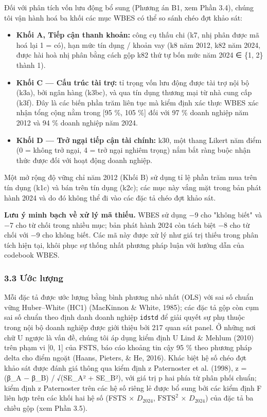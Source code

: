 \documentclass[12pt,a4paper]{article}
\providecommand{\tightlist}{\setlength{\itemsep}{0pt}\setlength{\parskip}{0pt}}
\begin{document}
Đối với phân tích vốn lưu động bổ sung (Phương án B1, xem Phần 3.4),
chúng tôi vận hành hoá ba khối các mục WBES có thể so sánh chéo đợt khảo
sát:

\begin{itemize}
\tightlist
\item
  \textbf{Khối A, Tiếp cận thanh khoản:} công cụ thấu chi (k7, nhị phân
  được mã hoá lại 1 = có), hạn mức tín dụng / khoản vay (k8 năm 2012,
  k82 năm 2024, được hài hoà nhị phân bằng cách gộp k82 thứ tự bốn mức
  năm 2024 ∈ \{1, 2\} thành 1).
\item
  \textbf{Khối C --- Cấu trúc tài trợ:} tỉ trọng vốn lưu động được tài
  trợ nội bộ (k3a), bởi ngân hàng (k3bc), và qua tín dụng thương mại từ
  nhà cung cấp (k3f). Đây là các biến phần trăm liên tục mà kiểm định
  xác thực WBES xác nhận tổng cộng nằm trong {[}95 \%, 105 \%{]} đối với
  97 \% doanh nghiệp năm 2012 và 94 \% doanh nghiệp năm 2024.
\item
  \textbf{Khối D --- Trở ngại tiếp cận tài chính:} k30, một thang Likert
  năm điểm (0 = không trở ngại, 4 = trở ngại nghiêm trọng) nắm bắt ràng
  buộc nhận thức được đối với hoạt động doanh nghiệp.
\end{itemize}

Một mở rộng độ vững chỉ năm 2012 (Khối B) sử dụng tỉ lệ phần trăm mua
trên tín dụng (k1c) và bán trên tín dụng (k2c); các mục này vắng mặt
trong bản phát hành 2024 và do đó không thể đi vào các đặc tả chéo đợt
khảo sát.

\textbf{Lưu ý minh bạch về xử lý mã thiếu.} WBES sử dụng −9 cho "không
biết" và −7 cho từ chối trong nhiều mục; bản phát hành 2024 còn tách
biệt −8 cho từ chối với −9 cho không biết. Các mã này được xử lý như giá
trị thiếu trong phân tích hiện tại, khôi phục sự thống nhất phương pháp
luận với hướng dẫn của codebook WBES.

\hypertarget{33-ux1b0ux1edbc-lux1b0ux1ee3ng}{%
\subsubsection{3.3 Ước lượng}\label{33-ux1b0ux1edbc-lux1b0ux1ee3ng}}

Mỗi đặc tả được ước lượng bằng bình phương nhỏ nhất (OLS) với sai số
chuẩn vững Huber--White (HC1) (MacKinnon \& White, 1985); các đặc tả gộp
còn cụm sai số chuẩn theo định danh doanh nghiệp \texttt{idstd} để giải
quyết sự phụ thuộc trong nội bộ doanh nghiệp được giới thiệu bởi 217
quan sát panel. Ở những nơi chữ U ngược là vấn đề, chúng tôi áp dụng
kiểm định U Lind \& Mehlum (2010) trên phạm vi {[}0, 1{]} của FSTS, báo
cáo khoảng tin cậy 95 \% theo phương pháp delta cho điểm ngoặt (Haans,
Pieters, \& He, 2016). Khác biệt hệ số chéo đợt khảo sát được đánh giá
thông qua kiểm định z Paternoster et al. (1998), z = (β\_A − β\_B) /
√(SE\_A² + SE\_B²), với giá trị p hai phía từ phân phối chuẩn; kiểm định
z Paternoster trên các hệ số riêng lẻ được bổ sung bởi các kiểm định F
liên hợp trên các khối hai hệ số (FSTS × \(D_{2024}\),
\(\mathrm{FSTS}^2\) × \(D_{2024}\)) của đặc tả ba chiều gộp (xem Phần
3.5).
\end{document}
